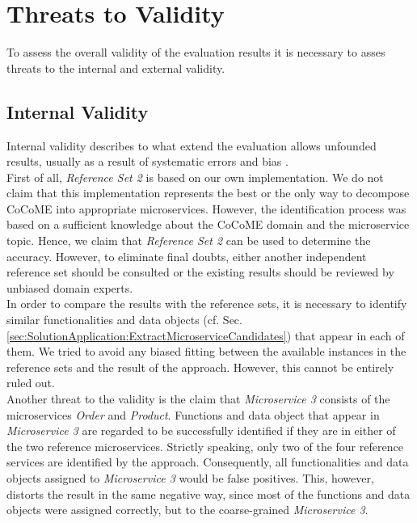 \section{Threats to Validity}
\label{sec:Evalutation:ThreatsToValidity}
To assess the overall validity of the evaluation results it is necessary to asses threats to the internal and external validity. 


\subsection{Internal Validity}
Internal validity describes to what extend the evaluation allows unfounded results, usually as a result of systematic errors and bias \cite{Validity}. \\
First of all, \textit{Reference Set 2} is based on our own implementation. We do not claim that this implementation represents the best or the only way to decompose CoCoME into appropriate microservices. However, the identification process was based on a sufficient knowledge about the CoCoME domain and the microservice topic. Hence, we claim that \textit{Reference Set 2} can be used to determine the accuracy. However, to eliminate final doubts, either another independent reference set should be consulted or the existing results should be reviewed by unbiased domain experts. \\
In order to compare the results with the reference sets, it is necessary to identify similar functionalities and data objects (cf. Sec.\ref{sec:SolutionApplication:ExtractMicroserviceCandidates}) that appear in each of them. We tried to avoid any biased fitting between the available instances in the reference sets and the result of the approach. However, this cannot be entirely ruled out.\\
Another threat to the validity is the claim that \textit{Microservice 3} consists of the microservices \textit{Order} and \textit{Product}. Functions and data object that appear in \textit{Microservice 3} are regarded to be successfully identified if they are in either of the two reference microservices. Strictly speaking, only two of the four reference services are identified by the approach. Consequently, all functionalities and data objects assigned to \textit{Microservice 3} would be false positives. This, however, distorts the result in the same negative way, since most of the functions and data objects were assigned correctly, but to the coarse-grained \textit{Microservice 3}.




